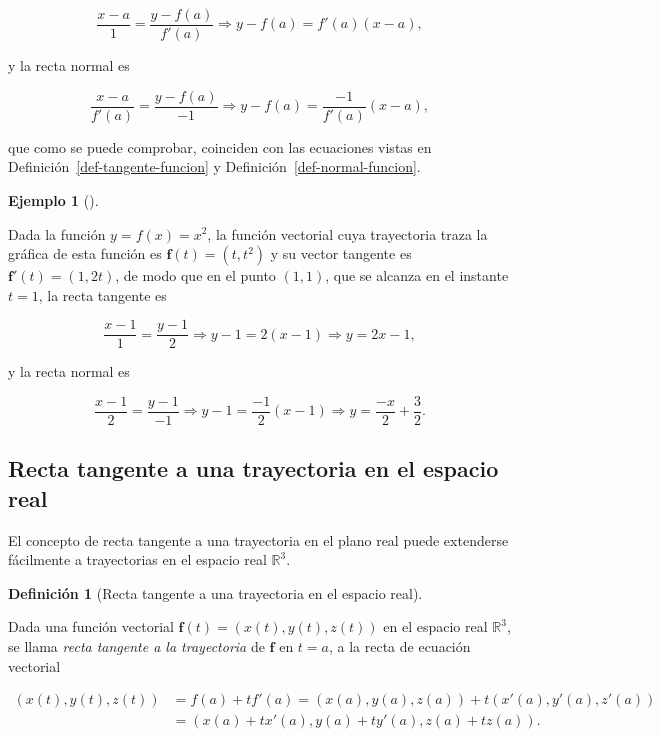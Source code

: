 \documentclass[
  a4paper,
]{scrreport}
\theoremstyle{plain}
\theoremstyle{definition}
\theoremstyle{plain}
\theoremstyle{plain}
\theoremstyle{definition}
\newtheorem{example}{Ejemplo}[chapter]
\theoremstyle{definition}
\newtheorem{definition}{Definición}[chapter]
\theoremstyle{remark}
\begin{document}
\[
\frac{x-a}{1} = \frac{y-f(a)}{f'(a)} \Rightarrow y-f(a) = f'(a)(x-a),
\]

y la recta normal es

\[
\frac{x-a}{f'(a)} = \frac{y-f(a)}{-1} \Rightarrow y-f(a) = \frac{-1}{f'(a)}(x-a),
\]

que como se puede comprobar, coinciden con las ecuaciones vistas en
Definición~\ref{def-tangente-funcion} y
Definición~\ref{def-normal-funcion}.

\begin{example}[]\protect\hypertarget{exm-tangente-normal-funcion}{}\label{exm-tangente-normal-funcion}

Dada la función \(y=f(x)=x^2\), la función vectorial cuya trayectoria
traza la gráfica de esta función es \(\mathbf{f}(t)=(t,t^2)\) y su
vector tangente es \(\mathbf{f}'(t)=(1,2t)\), de modo que en el punto
\((1,1)\), que se alcanza en el instante \(t=1\), la recta tangente es

\[
\frac{x-1}{1} = \frac{y-1}{2} \Rightarrow y-1 = 2(x-1) \Rightarrow y = 2x-1,
\]

y la recta normal es

\[
\frac{x-1}{2} = \frac{y-1}{-1} \Rightarrow y-1 = \frac{-1}{2}(x-1) \Rightarrow y = \frac{-x}{2}+\frac{3}{2}.
\]

\end{example}

\subsection{Recta tangente a una trayectoria en el espacio
real}\label{recta-tangente-a-una-trayectoria-en-el-espacio-real}

El concepto de recta tangente a una trayectoria en el plano real puede
extenderse fácilmente a trayectorias en el espacio real
\(\mathbb{R}^3\).

\begin{definition}[Recta tangente a una trayectoria en el espacio
real]\protect\hypertarget{def-tangente-trayectoria-espacio}{}\label{def-tangente-trayectoria-espacio}

Dada una función vectorial \(\mathbf{f}(t)=(x(t),y(t),z(t))\) en el
espacio real \(\mathbb{R}^3\), se llama \emph{recta tangente a la
trayectoria} de \(\mathbf{f}\) en \(t=a\), a la recta de ecuación
vectorial

\begin{align*}
(x(t), y(t), z(t)) 
&= f(a)+tf'(a) = (x(a), y(a), z(a)) + t(x'(a), y'(a), z'(a)) \\
& = (x(a)+tx'(a), y(a)+ty'(a), z(a)+tz(a)).
\end{align*}

\end{definition}
\end{document}
